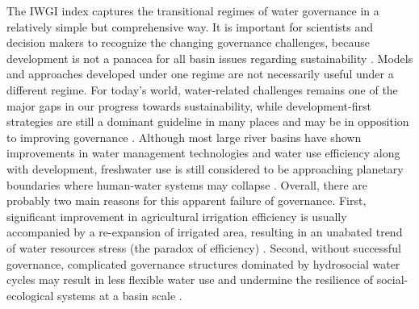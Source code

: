 The IWGI index captures the transitional regimes of water governance in a relatively simple but comprehensive way.
It is important for scientists and decision makers to recognize the changing governance challenges, because development is not a panacea for all basin issues regarding sustainability 
\cite{cummingLinkingEconomicGrowth2018,reyersSocialEcologicalSystemsInsights2018}.
Models and approaches developed under one regime are not necessarily useful under a different regime.
For today's world, water-related challenges remains one of the major gaps in our progress towards sustainability, while development-first strategies are still a dominant guideline in many places and may be in opposition to improving governance 
\cite{xuAssessingprogresssustainable2020,liuAerosolweakenedsummermonsoons2017,greveGlobalassessmentwater2018}. 
Although most large river basins have shown improvements in water management technologies and water use efficiency along with development, freshwater use is still considered to be approaching planetary boundaries where human-water systems may collapse 
\cite{anExploringeffectsGrain2017,degraafEnvironmentalflowlimits2019,hugginssocialecologicaldimensionschanging2020}.
Overall, there are probably two main reasons for this apparent failure of governance.
First, significant improvement in agricultural irrigation efficiency is usually accompanied by a re-expansion of irrigated area, resulting in an unabated trend of water resources stress (the paradox of efficiency) 
\cite{graftonparadoxirrigationefficiency2018}. 
Second, without successful governance, complicated governance structures dominated by hydrosocial water cycles may result in less flexible water use and undermine the resilience of social-ecological systems at a basin scale
\cite{qinFlexibilityintensityglobal2019,leviaHomogenizationterrestrialwater2020,grillMappingworldfreeflowing2019}.
